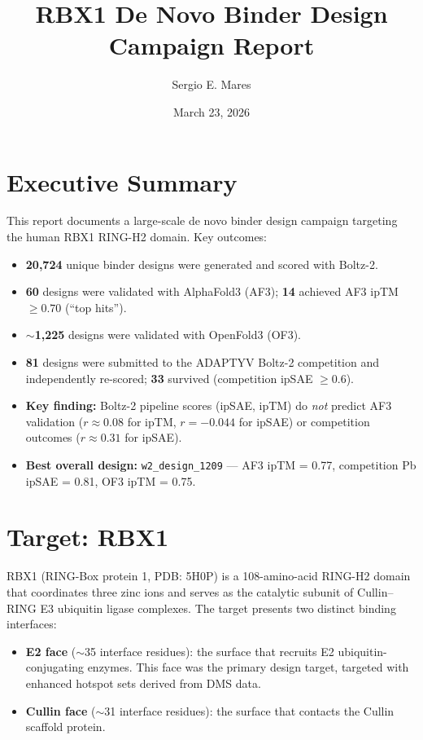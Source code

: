 \documentclass[11pt,a4paper]{article}
\title{\textbf{RBX1 De Novo Binder Design}\\[4pt]Campaign Report}
\author{Sergio E. Mares}
\date{March 23, 2026}
\begin{document}
\maketitle
\tableofcontents
\newpage

\section{Executive Summary}

This report documents a large-scale de novo binder design campaign targeting the human RBX1 RING-H2 domain. Key outcomes:

\begin{itemize}
  \item \textbf{20,724} unique binder designs were generated and scored with Boltz-2.
  \item \textbf{60} designs were validated with AlphaFold3 (AF3); \textbf{14} achieved AF3 ipTM $\geq 0.70$ (``top hits'').
  \item \textbf{$\sim$1,225} designs were validated with OpenFold3 (OF3).
  \item \textbf{81} designs were submitted to the ADAPTYV Boltz-2 competition and independently re-scored; \textbf{33} survived (competition ipSAE $\geq 0.6$).
  \item \textbf{Key finding:} Boltz-2 pipeline scores (ipSAE, ipTM) do \emph{not} predict AF3 validation ($r \approx 0.08$ for ipTM, $r = -0.044$ for ipSAE) or competition outcomes ($r \approx 0.31$ for ipSAE).
  \item \textbf{Best overall design:} \texttt{w2\_design\_1209} --- AF3 ipTM = 0.77, competition Pb ipSAE = 0.81, OF3 ipTM = 0.75.
\end{itemize}

\section{Target: RBX1}

RBX1 (RING-Box protein 1, PDB: 5H0P) is a 108-amino-acid RING-H2 domain that coordinates three zinc ions and serves as the catalytic subunit of Cullin--RING E3 ubiquitin ligase complexes. The target presents two distinct binding interfaces:

\begin{itemize}
  \item \textbf{E2 face} ($\sim$35 interface residues): the surface that recruits E2 ubiquitin-conjugating enzymes. This face was the primary design target, targeted with enhanced hotspot sets derived from DMS data.
  \item \textbf{Cullin face} ($\sim$31 interface residues): the surface that contacts the Cullin scaffold protein.
\end{itemize}
\end{document}

